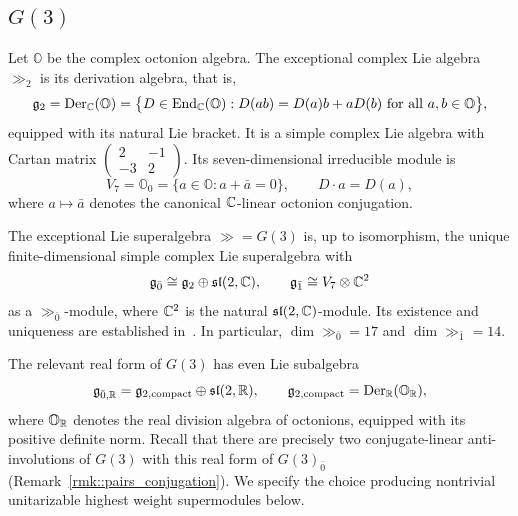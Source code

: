 \subsection{\texorpdfstring{$G(3)$}{G(3)}}\label{subsec::G(3)}

Let $\mathbb O$ be the complex octonion algebra. The exceptional complex Lie algebra $\gg_2$ is its derivation algebra, that is,
\begin{equation}
{\mathfrak{g}}_2
=
\operatorname{Der}_{{\mathbb C}}(\mathbb O)
=
\bigl\{
D\in\operatorname{End}_{{\mathbb C}}(\mathbb O):
D(ab)=D(a)b+aD(b)
\text{ for all }a,b\in\mathbb O
\bigr\},
\end{equation}
equipped with its natural Lie bracket. It is a simple complex Lie algebra with Cartan matrix
$
\left(\begin{smallmatrix}
2&-1\\
-3&2
\end{smallmatrix}\right).
$
Its seven-dimensional irreducible module is
\begin{equation}
V_7=\mathbb O_0
=
\{a\in\mathbb O:a+\bar a=0\},
\qquad
D\cdot a=D(a),
\end{equation}
where $a\mapsto\bar a$ denotes the canonical ${\mathbb C}$-linear octonion conjugation.

The exceptional Lie superalgebra $\gg=G(3)$ is, up to isomorphism, the unique finite-dimensional simple complex Lie superalgebra with
\begin{equation}
{\mathfrak{g}}_{\bar0}\cong{\mathfrak{g}}_2\oplus{\mathfrak{sl}}(2,{\mathbb C}),
\qquad
{\mathfrak{g}}_{\bar1}\cong V_7\otimes{\mathbb C}^2
\end{equation}
as a $\gg_{\bar0}$-module, where ${\mathbb C}^2$ is the natural ${\mathfrak{sl}}(2,{\mathbb C})$-module. Its existence and uniqueness are established in~\cite[Propositions~2.1.1(b) and~2.5.4(a)]{Kac}. In particular,
$\dim\gg_{\bar0}=17$ and $\dim\gg_{\bar1}=14$.

The relevant real form of $G(3)$ has even Lie subalgebra
\begin{equation}\label{eq::real_form_G(3)}
{\mathfrak{g}}_{\bar0,{\mathbb R}}
=
{\mathfrak{g}}_{2,\mathrm{compact}}\oplus{\mathfrak{sl}}(2,{\mathbb R}),
\qquad
{\mathfrak{g}}_{2,\mathrm{compact}}
=
\operatorname{Der}_{{\mathbb R}}(\mathbb O_{{\mathbb R}}),
\end{equation}
where $\mathbb O_{{\mathbb R}}$ denotes the real division algebra of octonions, equipped with its positive definite norm. Recall that there are precisely two conjugate-linear anti-involutions of $G(3)$ with this real form of $G(3)_{\bar{0}}$ (Remark~\ref{rmk::pairs_conjugation}). We specify the choice producing nontrivial unitarizable highest weight supermodules below.

